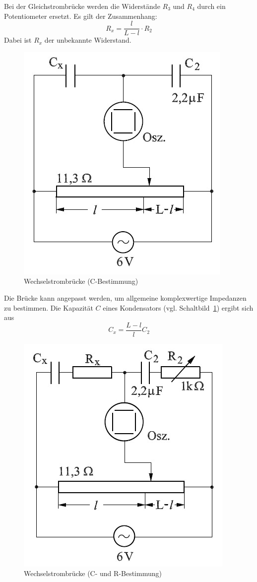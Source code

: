 Bei der Gleichstrombrücke werden die Widerstände $R_3$ und $R_4$ durch ein Potentiometer ersetzt.
Es gilt der Zusammenhang:
\begin{equation}
  R_x=\frac{l}{L-l}\cdot R_2
  \label{eq:wheat1}
\end{equation}
Dabei ist $R_x$ der unbekannte Widerstand.
\begin{figure}[H]
  \centering
  \includegraphics{wheatC.jpg}
  \caption{Wechselstrombrücke (C-Bestimmung)}
  \label{fig:wheatC}
\end{figure}
Die Brücke kann angepasst werden, um allgemeine komplexwertige Impedanzen zu bestimmen. Die Kapazität $C$ eines Kondensators (vgl. Schaltbild~\cref{fig:wheatC}) ergibt sich aus
\begin{equation}
  C_x=\frac{L-l}{l}C_2
  \label{eq:wheatkondensator}
\end{equation}
\begin{figure}[H]
  \centering
  \includegraphics{wheatCR.jpg}
  \caption{Wechselstrombrücke (C- und R-Bestimmung)}
  \label{fig:wheatCR}
\end{figure}

